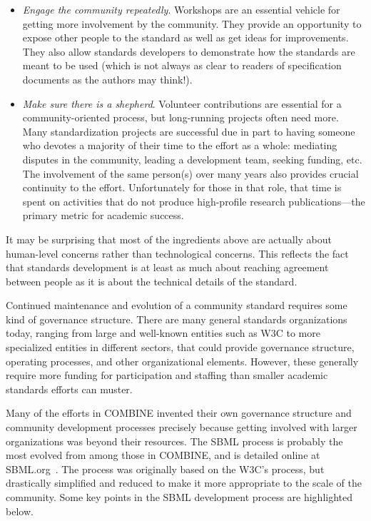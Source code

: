 \begin{itemize}
\item \emph{Engage the community repeatedly}.  Workshops are an essential vehicle for getting more involvement by the community.  They provide an opportunity to expose other people to the standard as well as get ideas for improvements.  They also allow standards developers to demonstrate how the standards are meant to be used (which is not always as clear to readers of specification documents as the authors may think!).

\item \emph{Make sure there is a shepherd}. Volunteer contributions are essential for a community-oriented process, but long-running projects often need more.  Many standardization projects are successful due in part to having someone who devotes a majority of their time to the effort as a whole: mediating disputes in the community, leading a development team, seeking funding, etc.  The involvement of the same person(s) over many years also provides crucial continuity to the effort.  Unfortunately for those in that role, that time is spent on activities that do not produce high-profile research publications---the primary metric for academic success.

\end{itemize}
\vspace*{-1em}

It may be surprising that most of the ingredients above are actually about human-level concerns rather than technological concerns.  This reflects the fact that standards development is at least as much about reaching agreement between people as it is about the technical details of the standard.


\clearpage
{}

Continued maintenance and evolution of a community standard requires some kind of governance structure.  There are many general standards organizations today, ranging from large and well-known entities such as W3C to more specialized entities in different sectors, that could provide governance structure, operating processes, and other organizational elements.  However, these generally require more funding for participation and staffing than smaller academic standards efforts can muster.

Many of the efforts in COMBINE invented their own governance structure and community development processes precisely because getting involved with larger organizations was beyond their resources.  The SBML process is probably the most evolved from among those in COMBINE, and is detailed online at SBML.org~\cite{sbml-process}.  The process was originally based on the W3C's process, but drastically simplified and reduced to make it more appropriate to the scale of the community.  Some key points in the SBML development process are highlighted below.

